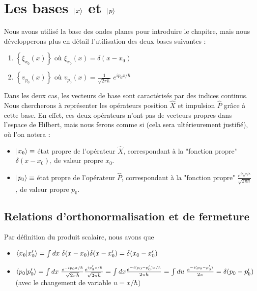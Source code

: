 \documentclass[../notesdecours]{subfiles}
\begin{document}
\section{Les bases $\ket x$ et $\ket p$}
Nous avons utilisé la base des ondes planes pour introduire le chapitre, mais nous développerons plus en détail l'utilisation des deux bases suivantes :
\begin{enumerate}
    \item $\left\{ \xi_{x_0}(x) \right\}$ où $\xi_{x_0}(x) = \delta(x-x_0)$ 
    \item $\left\{ v_{p_0}(x) \right\}$ où $v_{p_0}(x) = \frac{1}{\sqrt{2\pi \hbar}} \; e^{ip_0 x/\hbar}$
\end{enumerate}
Dans les deux cas, les vecteurs de base sont caractérisés par des indices continus. \\

Nous chercherons à représenter les opérateurs position $\hat{X}$ et impulsion $\hat{P}$ grâce à cette base. En effet, ces deux opérateurs n'ont pas de vecteurs propres dans l'espace de Hilbert, mais nous ferons comme si (cela sera ultérieurement justifié), où l'on notera : 
\begin{itemize}[label = \textbullet]
    \item $\ket{x_0} \equiv$ état propre de l'opérateur $\hat{X}$, correspondant à la "fonction propre" $\delta(x-x_0)$, de valeur propre $x_0$. 
    \item $\ket{p_0} \equiv$ état propre de l'opérateur $\hat{P}$, correspondant à la "fonction propre" $\frac{e^{ip_0 x/\hbar}}{\sqrt{2 \pi \hbar}}$, de valeur propre $p_0$. 
\end{itemize}

\subsection{Relations d'orthonormalisation et de fermeture}

Par définition du produit scalaire, nous avons que 
\begin{itemize}[label=\textbullet]
    \item $\braket{x_0|x_0'} = \int dx \; \delta (x-x_0) \delta (x-x_0') = \delta (x_0 - x_0')$
    \item $\braket{p_0|p_0'} = \int dx \; \frac{e^{-ip_0 x/\hbar}}{\sqrt{2\pi\hbar}} \frac{e^{ip_0'x/\hbar}}{\sqrt{2\pi\hbar}} = \int dx \frac{e^{-i (p_0 - p_0')x/\hbar}}{2\pi \hbar}	= \int du \; \frac{e^{-i(p_0 - p_0')}}{2\pi} = \delta (p_0-p_0')$ (avec le changement de variable $u = x/\hbar$) \\
\end{itemize}
\end{document}
